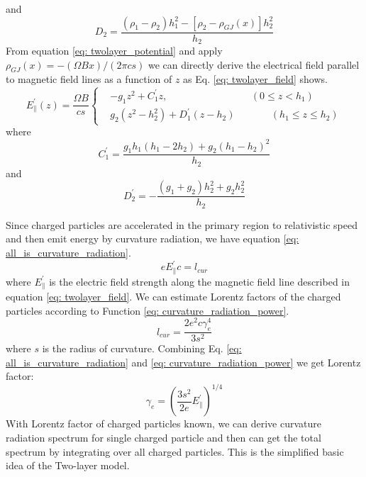 \documentclass[12pt]{report}
\begin{document}
      and 
      \begin{equation*}
        D_{2} = \frac{\left(\rho_1-\rho_2\right)h_1^2-\left[\rho_2-\rho_{GJ}\left(x\right)\right]h_2^2}{h_2}
      \end{equation*}
      From equation \ref{eq: twolayer_potential} and apply $\rho_{GJ}\left(x\right)=-\left(\Omega B x\right)/\left(2\pi cs\right)$ 
      we can directly derive the electrical field parallel to magnetic field lines as a function of $z$
      as Eq. \ref{eq: twolayer_field} shows.
      \begin{equation}
        \label{eq: twolayer_field}
          E^{\prime}_{\parallel}\left(z\right) = \frac{\Omega B}{cs}
          \left\{\begin{alignedat}{2}
             & -g_1 z^2 + C_1^{\prime}z ,  &&\left(0 \leq z < h_{1}\right) \\
             & g_2\left(z^2 - h_2^2\right) + D_1^{\prime}\left(z-h_2\right)  &&\qquad \left(h_{1} \leq z \leq h_{2}\right) 
          \end{alignedat}\right.
      \end{equation}
      where 
      \begin{equation*}
        C_{1}^{\prime} = \frac{g_1 h_1 \left(h_1 - 2h_2\right)+ g_2\left(h_1-h_2\right)^2}{h_2}  
      \end{equation*}
      and 
      \begin{equation*}
        D_{2}^{\prime} = -\frac{\left(g_1 + g_2\right)h_2^2 + g_2 h_2^2}{h_2}
      \end{equation*}

      Since charged particles are accelerated in the primary region to relativistic speed 
      and then emit energy by curvature radiation, we have equation \ref{eq: all_is_curvature_radiation}.
      \begin{equation}
        \label{eq: all_is_curvature_radiation}
        e E_{\parallel}^{\prime} c = l_{cur}
      \end{equation}
      where $E_\parallel^{\prime}$ is the electric field strength along the magnetic field line 
      described in equation \ref{eq: twolayer_field}.
      We can estimate Lorentz factors of the charged particles according to Function 
      \ref{eq: curvature_radiation_power}.
      \begin{equation}
        \label{eq: curvature_radiation_power}
        l_{cur} = \frac{2 e^2 c \gamma^{4}_{e}}{3s^2}
      \end{equation}      
      where $s$ is the radius of curvature. 
      Combining Eq. \ref{eq: all_is_curvature_radiation} and 
      \ref{eq: curvature_radiation_power} we get Lorentz factor: 
      \begin{equation}
        \label{eq: gamma_can_be_zero}
        \gamma_{e} = \left(\frac{3s^2}{2e} E_{\parallel}^{\prime}\right)^{1/4}
      \end{equation}
      With Lorentz factor of charged particles known, we can derive curvature radiation spectrum
      for single charged particle and then can get the total spectrum by integrating over all 
      charged particles. This is the simplified basic idea of the Two-layer model. 
\end{document}
